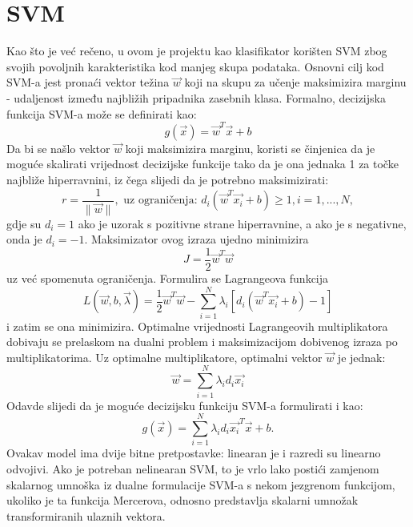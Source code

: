 \documentclass{report}
\begin{document}
\section{SVM}
Kao što je već rečeno, u ovom je projektu kao klasifikator korišten SVM zbog svojih povoljnih karakteristika kod manjeg skupa podataka. Osnovni cilj kod SVM-a jest pronaći vektor težina $\vec{w}$ koji na skupu za učenje maksimizira marginu - udaljenost između najbližih pripadnika zasebnih klasa. Formalno, decizijska funkcija SVM-a može se definirati kao:
\begin{equation*}
g(\vec{x}) = \vec{w}^T\vec{x} + b
\end{equation*}
Da bi se našlo vektor $\vec{w}$ koji maksimizira marginu, koristi se činjenica da je moguće skalirati vrijednost decizijske funkcije tako da je ona jednaka 1 za točke najbliže hiperravnini, iz čega slijedi da je potrebno maksimizirati:
\begin{equation*}
r = \frac{1}{\lVert \vec{w} \rVert}, \mbox{ uz ograničenja: } d_i(\vec{w}^T\vec{x_i} + b) \geq 1, i = 1,...,N,
\end{equation*}
gdje su $d_i = 1$ ako je uzorak s pozitivne strane hiperravnine, a ako je s negativne, onda je $d_i = -1$. Maksimizator ovog izraza ujedno minimizira 
\begin{equation*}
J = \frac{1}{2} \vec{w}^T\vec{w}
\end{equation*}
uz već spomenuta ograničenja. Formulira se Lagrangeova funkcija
\begin{equation*}
L(\vec{w}, b, \vec{\lambda}) = \frac{1}{2} \vec{w}^T\vec{w} - \sum_{i=1}^N\lambda_i\left[d_i(\vec{w}^T\vec{x_i} + b) - 1\right]
\end{equation*}
i zatim se ona minimizira. Optimalne vrijednosti Lagrangeovih multiplikatora dobivaju se prelaskom na dualni problem i maksimizacijom dobivenog izraza po multiplikatorima. Uz optimalne multiplikatore, optimalni vektor $\vec{w}$ je jednak:
\begin{equation*}
\vec{w} = \sum_{i=1}^N\lambda_id_i\vec{x_i}
\end{equation*}
Odavde slijedi da je moguće decizijsku funkciju SVM-a formulirati i kao:
\begin{equation*}
g(\vec{x}) = \sum_{i=1}^N\lambda_id_i\vec{x_i}^T\vec{x} + b.
\end{equation*}
Ovakav model ima dvije bitne pretpostavke: linearan je i razredi su linearno odvojivi. Ako je potreban nelinearan SVM, to je vrlo lako postići zamjenom skalarnog umnoška iz dualne formulacije SVM-a s nekom jezgrenom funkcijom, ukoliko je ta funkcija Mercerova, odnosno predstavlja skalarni umnožak transformiranih ulaznih vektora. 
\end{document}
